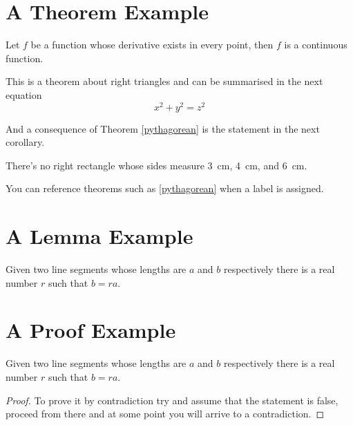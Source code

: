 \blindtext

\section{A Theorem Example}

\begin{theorem}
	Let \(f\) be a function whose derivative exists in every point, then \(f\) is 
	a continuous function.
\end{theorem}

\begin{theorem}
	\label{pythagorean}
	This is a theorem about right triangles and can be summarised in the next 
	equation 
	\[ x^2 + y^2 = z^2 \]
\end{theorem}

And a consequence of Theorem \ref{pythagorean} is the statement in the next corollary.

\begin{corollary}
	There's no right rectangle whose sides measure 3~cm, 4~cm, and 6~cm.
\end{corollary}

You can reference theorems such as \ref{pythagorean} when a label is assigned.

\blindtext

\section{A Lemma Example}

\begin{lemma}
	Given two line segments whose lengths are \(a\) and \(b\) respectively there is a 
	real number \(r\) such that \(b=ra\).
\end{lemma}

\blindtext

\section{A Proof Example}

\begin{lemma}
	Given two line segments whose lengths are \(a\) and \(b\) respectively there 
	is a real number \(r\) such that \(b=ra\).
\end{lemma}

\begin{proof}
	To prove it by contradiction try and assume that the statement is false,
	proceed from there and at some point you will arrive to a contradiction.
\end{proof}

